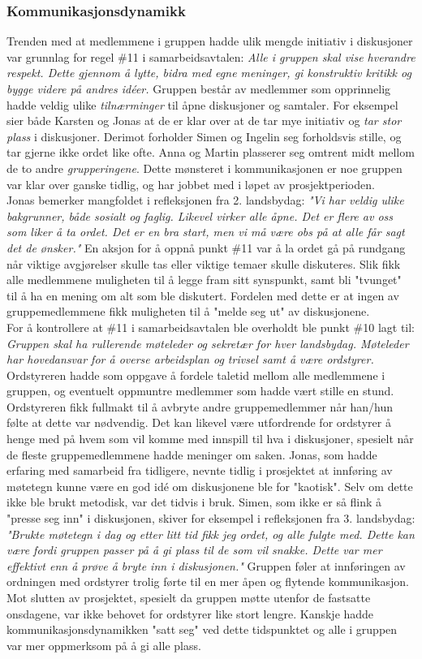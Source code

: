 \subsubsection{Kommunikasjonsdynamikk}

Trenden med at medlemmene i gruppen hadde ulik mengde initiativ i diskusjoner var grunnlag for regel \#11 i samarbeidsavtalen: \textit{Alle i gruppen skal vise hverandre respekt.
Dette gjennom å lytte, bidra med egne meninger, gi konstruktiv kritikk og bygge videre på andres id\'{e}er.} 
Gruppen består av medlemmer som opprinnelig hadde veldig ulike \textit{tilnærminger} til åpne diskusjoner og samtaler.
For eksempel sier både Karsten og Jonas at de er klar over at de tar mye initiativ og \textit{tar stor plass} i diskusjoner.
Derimot forholder Simen og Ingelin seg forholdsvis stille, og tar gjerne ikke ordet like ofte.
Anna og Martin plasserer seg omtrent midt mellom de to andre \textit{grupperingene}.
Dette mønsteret i kommunikasjonen er noe gruppen var klar over ganske tidlig, og har jobbet med i løpet av prosjektperioden.\\

Jonas bemerker mangfoldet  i refleksjonen fra 2. landsbydag: \textit{"Vi har veldig ulike bakgrunner, både sosialt og faglig. Likevel virker alle åpne. Det er flere av oss som liker å ta ordet. Det er en bra start, men vi må være obs på at alle får sagt det de ønsker."}
En aksjon for å oppnå punkt \#11 var å la ordet gå på rundgang når viktige avgjørelser skulle tas eller viktige temaer skulle diskuteres.
Slik fikk alle medlemmene muligheten til å legge fram sitt synspunkt, samt bli "tvunget" til å ha en mening om alt som ble diskutert.
Fordelen med dette er at ingen av gruppemedlemmene fikk muligheten til å "melde seg ut" av diskusjonene.\\

For å kontrollere at \#11 i samarbeidsavtalen ble overholdt ble punkt \#10 lagt til: \textit{Gruppen skal ha rullerende møteleder og sekretær for hver landsbydag. Møteleder har hovedansvar for å overse arbeidsplan og trivsel samt å være ordstyrer.}
Ordstyreren hadde som oppgave å fordele taletid mellom alle medlemmene i gruppen, og eventuelt oppmuntre medlemmer som hadde vært stille en stund.
Ordstyreren fikk fullmakt til å avbryte andre gruppemedlemmer når han/hun følte at dette var nødvendig.
Det kan likevel være utfordrende for ordstyrer å henge med på hvem som vil komme med innspill til hva i diskusjoner, spesielt når de fleste gruppemedlemmene hadde meninger om saken.
Jonas, som hadde erfaring med samarbeid fra tidligere, nevnte tidlig i prosjektet at innføring av møtetegn kunne være en god id\'{e} om diskusjonene ble for "kaotisk".
Selv om dette ikke ble brukt metodisk, var det tidvis i bruk.
Simen, som ikke er så flink å "presse seg inn" i diskusjonen, skiver for eksempel i refleksjonen fra 3. landsbydag: \textit{"Brukte møtetegn i dag og etter litt tid fikk jeg ordet, og alle fulgte med. Dette kan være fordi gruppen passer på å gi plass til de som vil snakke. Dette var mer effektivt enn å prøve å bryte inn i diskusjonen."}
Gruppen føler at innføringen av ordningen med ordstyrer trolig førte til en mer åpen og flytende kommunikasjon. \\

Mot slutten av prosjektet, spesielt da gruppen møtte utenfor de fastsatte onsdagene, var ikke behovet for ordstyrer like stort lengre.
Kanskje hadde kommunikasjonsdynamikken "satt seg" ved dette tidspunktet og alle i gruppen var mer oppmerksom på å gi alle plass.
